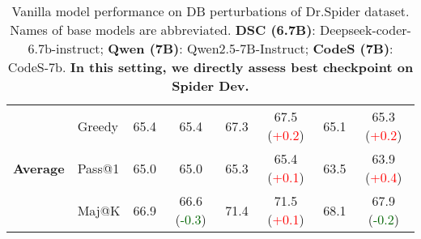 \begin{table*}[t!]
\begin{adjustbox}{max width=\textwidth}
\begin{tabular}{c | l | c c | c c | c c }
        \multirow{3}{*}{\textbf{Average}} & Greedy & 65.4 & 65.4 \phantom{(+0.3)} & 67.3 & 67.5 (\textcolor{red}{+0.2}) & 65.1 & 65.3 (\textcolor{red}{+0.2}) \\
& Pass@1 & 65.0 & 65.0 \phantom{(+0.3)} & 65.3 & 65.4 (\textcolor{red}{+0.1}) & 63.5 & 63.9 (\textcolor{red}{+0.4}) \\
& Maj@K & 66.9 & 66.6 (\textcolor{darkgreen}{-0.3}) & 71.4 & 71.5 (\textcolor{red}{+0.1}) & 68.1 & 67.9 (\textcolor{darkgreen}{-0.2}) \\

        
        \bottomrule
    \end{tabular}
\end{adjustbox}
    \caption{Vanilla model performance on DB perturbations of Dr.Spider dataset. Names of base models are abbreviated. \textbf{DSC (6.7B)}: Deepseek-coder-6.7b-instruct; \textbf{Qwen (7B)}: Qwen2.5-7B-Instruct; \textbf{CodeS (7B)}: CodeS-7b. \textbf{In this setting, we directly assess best checkpoint on Spider Dev.}} 
    \label{tab:drSpiderDBVanilla}
\end{table*}